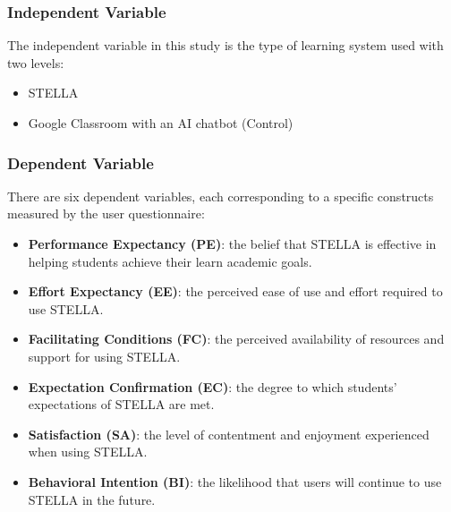 \documentclass[sigconf,natbib=true]{acmart}
\begin{document}
\subsubsection{Independent Variable}
The independent variable in this study is the type of learning system used with two levels:
\begin{itemize}
  \item STELLA
  \item Google Classroom with an AI chatbot (Control) 
\end{itemize}

\subsubsection{Dependent Variable}
There are six dependent variables, each corresponding to a specific constructs measured by the user questionnaire:
\begin{itemize}
  \item \textbf{Performance Expectancy (PE)}: the belief that STELLA is effective in helping students achieve their learn academic goals.
  \item \textbf{Effort Expectancy (EE)}: the perceived ease of use and effort required to use STELLA\@.
  \item \textbf{Facilitating Conditions (FC)}: the perceived availability of resources and support for using STELLA\@.
  \item \textbf{Expectation Confirmation (EC)}: the degree to which students' expectations of STELLA are met.
  \item \textbf{Satisfaction (SA)}: the level of contentment and enjoyment experienced when using STELLA\@.
  \item \textbf{Behavioral Intention (BI)}: the likelihood that users will continue to use STELLA in the future.
\end{itemize}
\end{document}

